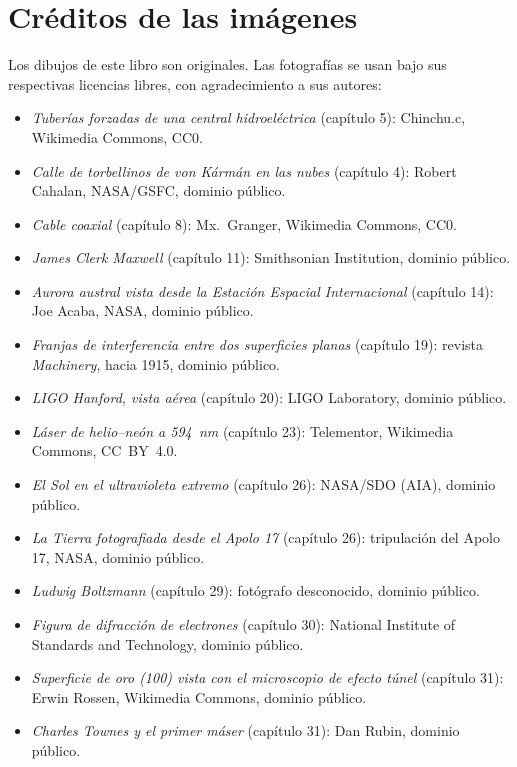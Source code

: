 \chapter*{Créditos de las imágenes}

Los dibujos de este libro son originales. Las fotografías se usan bajo
sus respectivas licencias libres, con agradecimiento a sus autores:

\begin{itemize}
  \item \emph{Tuberías forzadas de una central hidroeléctrica}
        (capítulo 5): Chinchu.c, Wikimedia Commons, CC0.
  \item \emph{Calle de torbellinos de von Kármán en las nubes}
        (capítulo 4): Robert Cahalan, NASA/GSFC, dominio público.
  \item \emph{Cable coaxial} (capítulo 8): Mx.~Granger, Wikimedia
        Commons, CC0.
  \item \emph{James Clerk Maxwell} (capítulo 11): Smithsonian
        Institution, dominio público.
  \item \emph{Aurora austral vista desde la Estación Espacial
        Internacional} (capítulo 14): Joe Acaba, NASA, dominio
        público.
  \item \emph{Franjas de interferencia entre dos superficies planas}
        (capítulo 19): revista \emph{Machinery}, hacia 1915, dominio
        público.
  \item \emph{LIGO Hanford, vista aérea} (capítulo 20): LIGO
        Laboratory, dominio público.
  \item \emph{Láser de helio--neón a 594~nm} (capítulo 23):
        Telementor, Wikimedia Commons, CC~BY~4.0.
  \item \emph{El Sol en el ultravioleta extremo} (capítulo 26):
        NASA/SDO (AIA), dominio público.
  \item \emph{La Tierra fotografiada desde el Apolo 17}
        (capítulo 26): tripulación del Apolo 17, NASA, dominio
        público.
  \item \emph{Ludwig Boltzmann} (capítulo 29): fotógrafo desconocido,
        dominio público.
  \item \emph{Figura de difracción de electrones} (capítulo 30):
        National Institute of Standards and Technology, dominio
        público.
  \item \emph{Superficie de oro (100) vista con el microscopio de
        efecto túnel} (capítulo 31): Erwin Rossen, Wikimedia Commons,
        dominio público.
  \item \emph{Charles Townes y el primer máser} (capítulo 31): Dan
        Rubin, dominio público.
\end{itemize}

